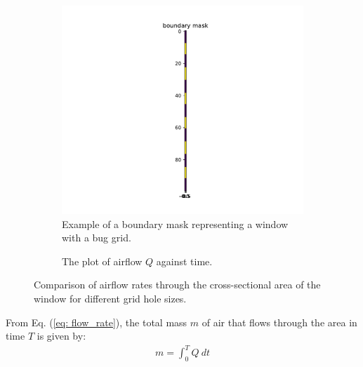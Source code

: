 \begin{figure}[H]
    \centering
    \begin{subfigure}[b]{0.47\textwidth}
        \centering
        \includegraphics[width=\textwidth]{figures/bound_ex1.pdf}
        \caption{Example of a boundary mask representing a window with a bug grid.}
        \label{fig: bound3}
    \end{subfigure}
    \hfill
    \begin{subfigure}[b]{0.47\textwidth}
        \centering
        \caption{The plot of airflow $Q$ against time.}
        \label{fig: flowrate3}
    \end{subfigure}
    \caption{Comparison of airflow rates through the cross-sectional area of the window for different grid hole sizes.}
    \label{fig: bound_plos_flowrate3}
\end{figure}



From Eq. (\ref{eq: flow_rate}), the total mass $m$ of air that flows through the area in time $T$ is given by:
\begin{gather}
    m = \int_0^T Q ~dt
\end{gather}

